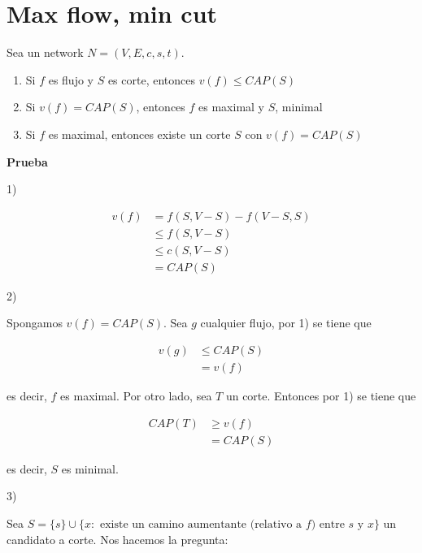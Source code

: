 \documentclass[10pt,a4paper]{article}
\begin{document}
\section*{Max flow, min cut}

Sea un network $N = (V, E, c, s, t)$.

\begin{enumerate}

	\item Si $f$ es flujo y $S$ es corte, entonces $v(f) \leq CAP(S) $
	\item Si $v(f) = CAP(S)$, entonces $f$ es maximal y $S$, minimal
	\item Si $f$ es maximal, entonces existe un corte $S$ con $v(f) = CAP(S)$
\end{enumerate}

\textbf{Prueba}

1)

\begin{center}
\begin{align*} v(f) &= f(S, V - S) - f(V-S, S)\\ &\leq f(S, V - S) \\ &\leq c(S, V - S)\\ &= CAP(S) \end{align*}
\end{center}

2)

Spongamos $v(f) = CAP(S)$. Sea $g$ cualquier flujo, por 1) se tiene que

\begin{center}
\begin{align*} v(g) &\leq CAP(S)\\ &= v(f) \end{align*}
\end{center}

es decir, $f$ es maximal. Por otro lado, sea $T$ un corte. Entonces por 1) se tiene que

\begin{center}
\begin{align*} CAP(T) &\geq v(f)\\& = CAP(S) \end{align*}
\end{center}

es decir, $S$ es minimal.

3)

Sea $S =\{s\}\cup\{x: \text{ existe un camino aumentante (relativo a } f \text{)}\text{ entre }s \text{ y } x \}$ un candidato a corte. Nos hacemos la pregunta:
\end{document}
